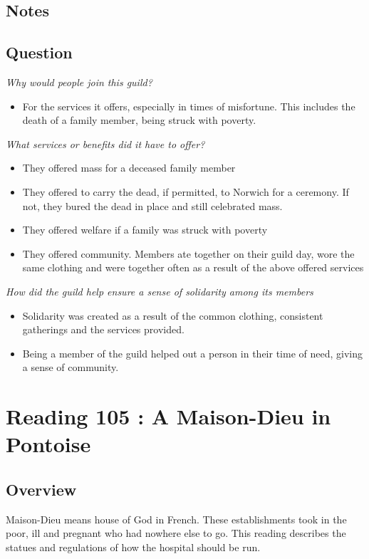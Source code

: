 \documentclass[12pt]{article}
\begin{document}
\subsection*{Notes}

\subsection*{Question}
\textit{Why would people join this guild?}
\begin{itemize}
	\item For the services it offers, especially in times of misfortune. This includes the death of a family member, being struck with poverty.
\end{itemize}

\textit{What services or benefits did it have to offer?}
\begin{itemize}
	\item They offered mass for a deceased family member
	\item They offered to carry the dead, if permitted, to Norwich for a ceremony. If not, they bured the dead in place and still celebrated mass.
	\item They offered welfare if a family was struck with poverty
	\item They offered community. Members ate together on their guild day, wore the same clothing and were together often as a result of the above offered services
\end{itemize}

\textit{How did the guild help ensure a sense of solidarity among its members}
\begin{itemize}
	\item Solidarity was created as a result of the common clothing, consistent gatherings and the services provided.
	\item Being a member of the guild helped out a person in their time of need, giving a sense of community.
\end{itemize}

\section*{Reading 105 : A Maison-Dieu in Pontoise}

\subsection*{Overview}

Maison-Dieu means house of God in French. These establishments took in the poor, ill and pregnant who had nowhere else to go. This reading describes the statues and regulations of how the hospital should be run.
\end{document}
